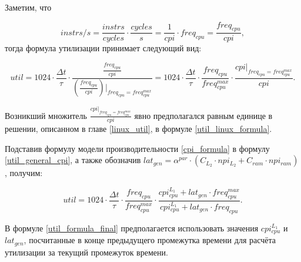 

    Заметим, что

    \begin{equation}
        instrs / s = \frac{instrs}{cycles} \cdot \frac{cycles}{s} = \frac{1}{cpi} \cdot freq_{cpu} =
        \frac{freq_{cpu}}{cpi},
    \end{equation}
    тогда формула утилизации принимает следующий вид:

    \begin{equation} \label{util_general_cpi}
        util = 1024 \cdot \frac{\Delta t}{\tau} \cdot \frac{\frac{freq_{cpu}}{cpi}}{\left( \frac{freq_{cpu}}{cpi} \right)
            \bigg|_{freq_{cpu} = freq_{cpu}^{max}}} = 1024 \cdot \frac{\Delta t}{\tau} \cdot
            \frac{freq_{cpu}}{freq_{cpu}^{max}} \cdot \frac{cpi |_{freq_{cpu} = freq_{cpu}^{max}}}{cpi}.
    \end{equation}

    Возникший множитель $\frac{cpi |_{freq_{cpu} = freq_{cpu}^{max}}}{cpi}$ явно предполагался равным единице
    в решении, описанном в главе \ref{linux_util}, в формуле \eqref{util_linux_formula}.

    Подставив формулу модели производительности \eqref{cpi_formula} в формулу \eqref{util_general_cpi},
    а также обозначив $lat_{gen} = \alpha^{par} \cdot \left( C_{L_2} \cdot npi_{L_2} + C_{ram} \cdot npi_{ram} \right)$,
    получим:

    \begin{equation} \label{util_formula_final}
        util = 1024 \cdot \frac{\Delta t}{\tau} \cdot \frac{freq_{cpu}}{freq_{cpu}^{max}} \cdot
            \frac{cpi_{cpu}^{L_1} + lat_{gen} \cdot freq_{cpu}^{max}}
                 {cpi_{cpu}^{L_1} + lat_{gen} \cdot freq_{cpu}}.
    \end{equation}

    В формуле \eqref{util_formula_final} предполагается использовать значения $cpi_{cpu}^{L_1}$ и $lat_{gen}$,
    посчитанные в конце предыдущего промежутка времени для расчёта утилизации за текущий промежуток времени.

